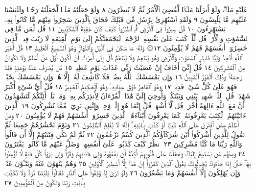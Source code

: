 عَلَيْهِ مَلَكࣱۖ وَلَوْ أَنزَلْنَا مَلَكࣰا لَّقُضِيَ ٱلْأَمْرُ ثُمَّ لَا يُنظَرُونَ ٨
وَلَوْ جَعَلْنَٰهُ مَلَكࣰا لَّجَعَلْنَٰهُ رَجُلࣰا وَلَلَبَسْنَا عَلَيْهِم مَّا
يَلْبِسُونَ ٩ وَلَقَدِ ٱسْتُهْزِئَ بِرُسُلࣲ مِّن قَبْلِكَ فَحَاقَ بِٱلَّذِينَ
سَخِرُوا۟ مِنْهُم مَّا كَانُوا۟ بِهِۦ يَسْتَهْزِءُونَ ١٠ قُلْ سِيرُوا۟
فِي ٱلْأَرْضِ ثُمَّ ٱنظُرُوا۟ كَيْفَ كَانَ عَٰقِبَةُ ٱلْمُكَذِّبِينَ ١١
قُل لِّمَن مَّا فِي ٱلسَّمَٰوَٰتِ وَٱلْأَرْضِۖ قُل لِّلَّهِۚ كَتَبَ عَلَىٰ
نَفْسِهِ ٱلرَّحْمَةَۚ لَيَجْمَعَنَّكُمْ إِلَىٰ يَوْمِ ٱلْقِيَٰمَةِ لَا رَيْبَ
فِيهِۚ ٱلَّذِينَ خَسِرُوٓا۟ أَنفُسَهُمْ فَهُمْ لَا يُؤْمِنُونَ ١٢۞ وَلَهُۥ
مَا سَكَنَ فِي ٱلَّيْلِ وَٱلنَّهَارِۚ وَهُوَ ٱلسَّمِيعُ ٱلْعَلِيمُ ١٣ قُلْ
أَغَيْرَ ٱللَّهِ أَتَّخِذُ وَلِيࣰّا فَاطِرِ ٱلسَّمَٰوَٰتِ وَٱلْأَرْضِ وَهُوَ
يُطْعِمُ وَلَا يُطْعَمُۗ قُلْ إِنِّيٓ أُمِرْتُ أَنْ أَكُونَ أَوَّلَ مَنْ أَسْلَمَۖ
وَلَا تَكُونَنَّ مِنَ ٱلْمُشْرِكِينَ ١٤ قُلْ إِنِّيٓ أَخَافُ إِنْ عَصَيْتُ
رَبِّي عَذَابَ يَوْمٍ عَظِيمࣲ ١٥ مَّن يُصْرَفْ عَنْهُ يَوْمَئِذࣲ فَقَدْ رَحِمَهُۥۚ
وَذَٰلِكَ ٱلْفَوْزُ ٱلْمُبِينُ ١٦ وَإِن يَمْسَسْكَ ٱللَّهُ بِضُرࣲّ فَلَا كَاشِفَ
لَهُۥٓ إِلَّا هُوَۖ وَإِن يَمْسَسْكَ بِخَيْرࣲ فَهُوَ عَلَىٰ كُلِّ شَيْءࣲ قَدِيرࣱ ١٧
وَهُوَ ٱلْقَاهِرُ فَوْقَ عِبَادِهِۦۚ وَهُوَ ٱلْحَكِيمُ ٱلْخَبِيرُ ١٨
قُلْ أَيُّ شَيْءٍ أَكْبَرُ شَهَٰدَةࣰۖ قُلِ ٱللَّهُۖ شَهِيدُۢ بَيْنِي وَبَيْنَكُمْۚ وَأُوحِيَ إِلَيَّ هَٰذَا
ٱلْقُرْءَانُ لِأُنذِرَكُم بِهِۦ وَمَنۢ بَلَغَۚ أَئِنَّكُمْ لَتَشْهَدُونَ أَنَّ مَعَ ٱللَّهِ ءَالِهَةً
أُخْرَىٰۚ قُل لَّآ أَشْهَدُۚ قُلْ إِنَّمَا هُوَ إِلَٰهࣱ وَٰحِدࣱ وَإِنَّنِي بَرِيٓءࣱ مِّمَّا
تُشْرِكُونَ ١٩ ٱلَّذِينَ ءَاتَيْنَٰهُمُ ٱلْكِتَٰبَ يَعْرِفُونَهُۥ كَمَا يَعْرِفُونَ أَبْنَآءَهُمُۘ
ٱلَّذِينَ خَسِرُوٓا۟ أَنفُسَهُمْ فَهُمْ لَا يُؤْمِنُونَ ٢٠ وَمَنْ أَظْلَمُ مِمَّنِ ٱفْتَرَىٰ عَلَى
ٱللَّهِ كَذِبًا أَوْ كَذَّبَ بِـَٔايَٰتِهِۦٓۚ إِنَّهُۥ لَا يُفْلِحُ ٱلظَّٰلِمُونَ ٢١ وَيَوْمَ نَحْشُرُهُمْ
جَمِيعࣰا ثُمَّ نَقُولُ لِلَّذِينَ أَشْرَكُوٓا۟ أَيْنَ شُرَكَآؤُكُمُ ٱلَّذِينَ كُنتُمْ تَزْعُمُونَ ٢٢
ثُمَّ لَمْ تَكُن فِتْنَتُهُمْ إِلَّآ أَن قَالُوا۟ وَٱللَّهِ رَبِّنَا مَا كُنَّا مُشْرِكِينَ ٢٣
ٱنظُرْ كَيْفَ كَذَبُوا۟ عَلَىٰٓ أَنفُسِهِمْۚ وَضَلَّ عَنْهُم مَّا كَانُوا۟ يَفْتَرُونَ ٢٤
وَمِنْهُم مَّن يَسْتَمِعُ إِلَيْكَۖ وَجَعَلْنَا عَلَىٰ قُلُوبِهِمْ أَكِنَّةً أَن يَفْقَهُوهُ
وَفِيٓ ءَاذَانِهِمْ وَقْرࣰاۚ وَإِن يَرَوْا۟ كُلَّ ءَايَةࣲ لَّا يُؤْمِنُوا۟ بِهَاۖ حَتَّىٰٓ إِذَا
جَآءُوكَ يُجَٰدِلُونَكَ يَقُولُ ٱلَّذِينَ كَفَرُوٓا۟ إِنْ هَٰذَآ إِلَّآ أَسَٰطِيرُ
ٱلْأَوَّلِينَ ٢٥ وَهُمْ يَنْهَوْنَ عَنْهُ وَيَنْـَٔوْنَ عَنْهُۖ وَإِن يُهْلِكُونَ إِلَّآ
أَنفُسَهُمْ وَمَا يَشْعُرُونَ ٢٦ وَلَوْ تَرَىٰٓ إِذْ وُقِفُوا۟ عَلَى ٱلنَّارِ فَقَالُوا۟
يَٰلَيْتَنَا نُرَدُّ وَلَا نُكَذِّبَ بِـَٔايَٰتِ رَبِّنَا وَنَكُونَ مِنَ ٱلْمُؤْمِنِينَ ٢٧
